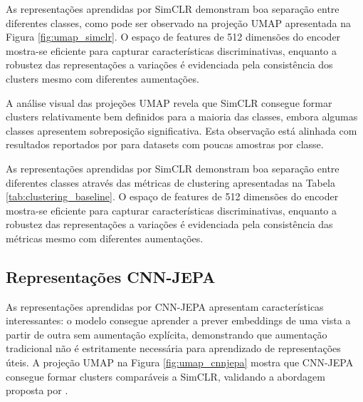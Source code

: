 As representações aprendidas por SimCLR demonstram boa separação entre diferentes classes, como pode ser observado na projeção UMAP apresentada na Figura \ref{fig:umap_simclr}. O espaço de features de 512 dimensões do encoder mostra-se eficiente para capturar características discriminativas, enquanto a robustez das representações a variações é evidenciada pela consistência dos clusters mesmo com diferentes aumentações.

A análise visual das projeções UMAP revela que SimCLR consegue formar clusters relativamente bem definidos para a maioria das classes, embora algumas classes apresentem sobreposição significativa. Esta observação está alinhada com resultados reportados por \cite{chen2020simclr} para datasets com poucas amostras por classe.


As representações aprendidas por SimCLR demonstram boa separação entre diferentes classes através das métricas de clustering apresentadas na Tabela \ref{tab:clustering_baseline}. O espaço de features de 512 dimensões do encoder mostra-se eficiente para capturar características discriminativas, enquanto a robustez das representações a variações é evidenciada pela consistência das métricas mesmo com diferentes aumentações.

\subsection{Representações CNN-JEPA}

As representações aprendidas por CNN-JEPA apresentam características interessantes: o modelo consegue aprender a prever embeddings de uma vista a partir de outra sem aumentação explícita, demonstrando que aumentação tradicional não é estritamente necessária para aprendizado de representações úteis. A projeção UMAP na Figura \ref{fig:umap_cnnjepa} mostra que CNN-JEPA consegue formar clusters comparáveis a SimCLR, validando a abordagem proposta por \cite{kalapos2025cnnjepa}.

